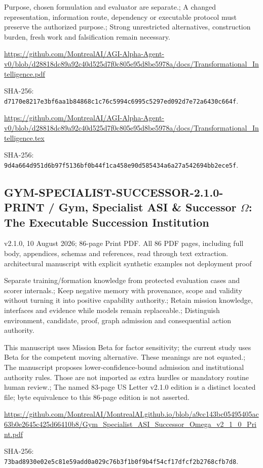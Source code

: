 \documentclass[10pt]{article}
\begin{document}
Purpose, chosen formulation and evaluator are separate.; A changed representation, information route, dependency or executable protocol must preserve the authorized purpose.; Strong unrestricted alternatives, construction burden, fresh work and falsification remain necessary.

\url{https://github.com/MontrealAI/AGI-Alpha-Agent-v0/blob/d28818dc89a92c40d525d7f0c805e95d8be5978a/docs/Transformational_Intelligence.pdf}\par SHA-256: \nolinkurl{d7170e8217e3bf6aa1b84868c1c76c5994c6995c5297ed092d7e72a6430c664f}.

\url{https://github.com/MontrealAI/AGI-Alpha-Agent-v0/blob/d28818dc89a92c40d525d7f0c805e95d8be5978a/docs/Transformational_Intelligence.tex}\par SHA-256: \nolinkurl{9d4a664d951d6b97f5136bf0b44f1ca458e90d585434a6a27a542694bb2ece5f}.

\subsection*{GYM-SPECIALIST-SUCCESSOR-2.1.0-PRINT / Gym, Specialist ASI \& Successor $\Omega$: The Executable Succession Institution}

v2.1.0, 10 August 2026; 86-page Print PDF. All 86 PDF pages, including full body, appendices, schemas and references, read through text extraction. architectural manuscript with explicit synthetic examples not deployment proof

Separate training/formation knowledge from protected evaluation cases and scorer internals.; Keep negative memory with provenance, scope and validity without turning it into positive capability authority.; Retain mission knowledge, interfaces and evidence while models remain replaceable.; Distinguish environment, candidate, proof, graph admission and consequential action authority.

This manuscript uses Mission Beta for factor sensitivity; the current study uses Beta for the competent moving alternative. These meanings are not equated.; The manuscript proposes lower-confidence-bound admission and institutional authority rules. Those are not imported as extra hurdles or mandatory routine human review.; The named 83-page US Letter v2.1.0 edition is a distinct located file; byte equivalence to this 86-page edition is not asserted.

\url{https://github.com/MontrealAI/MontrealAI.github.io/blob/a9cc143bc05495405ac63b0e2645c425d66410b8/Gym_Specialist_ASI_Successor_Omega_v2_1_0_Print.pdf}\par SHA-256: \nolinkurl{73bad8930e02e5c81e59add0a029c76b3f1b0f9b4f54cf17dfcf2b2768cfb7d8}.
\end{document}
